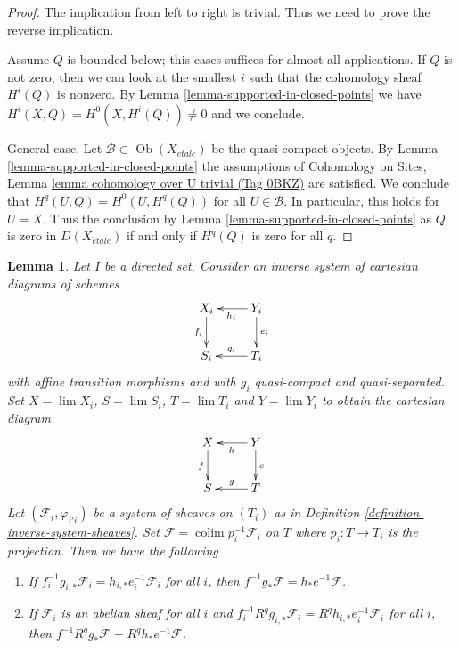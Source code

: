 \documentclass{amsart}
\theoremstyle{plain}
\newtheorem{lemma}[subsection]{Lemma}
\theoremstyle{definition}
\theoremstyle{remark}
\numberwithin{equation}{subsection}
\def\lim{\mathop{\mathrm{lim}}\nolimits}
\def\colim{\mathop{\mathrm{colim}}\nolimits}
\def\Ob{\mathop{\mathrm{Ob}}\nolimits}
\def\etale{{\acute{e}tale}}
\begin{document}
\begin{proof}
The implication from left to right is trivial. Thus we need
to prove the reverse implication.

\medskip\noindent
Assume $Q$ is bounded below; this cases suffices for almost all
applications. If $Q$ is not zero, then we can look at the smallest $i$
such that the cohomology sheaf $H^i(Q)$ is nonzero.
By Lemma \ref{lemma-supported-in-closed-points} we have
$H^i(X, Q) = H^0(X, H^i(Q)) \not = 0$ and we conclude.

\medskip\noindent
General case. Let $\mathcal{B} \subset \Ob(X_\etale)$ be the
quasi-compact objects. By Lemma \ref{lemma-supported-in-closed-points}
the assumptions of Cohomology on Sites, Lemma
\href{https://stacks.math.columbia.edu/tag/0BKZ}{lemma cohomology over U trivial (Tag 0BKZ)}
are satisfied. We conclude that $H^q(U, Q) = H^0(U, H^q(Q))$
for all $U \in \mathcal{B}$. In particular, this holds for $U = X$.
Thus the conclusion by Lemma \ref{lemma-supported-in-closed-points}
as $Q$ is zero in $D(X_\etale)$ if and only if $H^q(Q)$ is zero
for all $q$.
\end{proof}


\begin{lemma}
\label{lemma-base-change-Rf-star-colim}
Let $I$ be a directed set. Consider an inverse system of
cartesian diagrams of schemes
$$
\xymatrix{
X_i \ar[d]_{f_i} & Y_i \ar[l]^{h_i} \ar[d]^{e_i} \\
S_i & T_i \ar[l]_{g_i}
}
$$
with affine transition morphisms and with $g_i$ quasi-compact and
quasi-separated. Set $X = \lim X_i$,
$S = \lim S_i$, $T = \lim T_i$ and $Y = \lim Y_i$ to
obtain the cartesian diagram
$$
\xymatrix{
X \ar[d]_f & Y \ar[l]^h \ar[d]^e \\
S & T \ar[l]_g
}
$$
Let $(\mathcal{F}_i, \varphi_{i'i})$ be a system of sheaves on
$(T_i)$ as in Definition \ref{definition-inverse-system-sheaves}. Set
$\mathcal{F} = \colim p_i^{-1}\mathcal{F}_i$ on $T$
where $p_i : T \to T_i$ is the projection.
Then we have the following
\begin{enumerate}
\item If $f_i^{-1}g_{i, *}\mathcal{F}_i = h_{i, *}e_i^{-1}\mathcal{F}_i$
for all $i$, then
$f^{-1}g_*\mathcal{F} = h_*e^{-1}\mathcal{F}$.
\item If $\mathcal{F}_i$ is an abelian sheaf for all $i$ and
$f_i^{-1}R^qg_{i, *}\mathcal{F}_i = R^qh_{i, *}e_i^{-1}\mathcal{F}_i$
for all $i$, then
$f^{-1}R^qg_*\mathcal{F} = R^qh_*e^{-1}\mathcal{F}$.
\end{enumerate}
\end{lemma}
\end{document}
